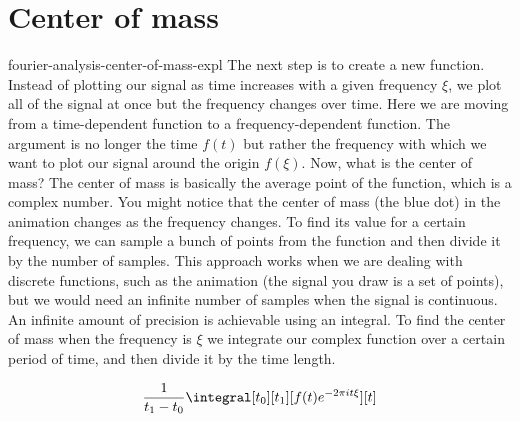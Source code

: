 \documentclass[preview]{standalone}
\begin{document}
\genpage

\section{Center of mass}

\begin{snippet}{fourier-analysis-center-of-mass-expl}
    The next step is to create a new function. Instead of plotting our signal
    as time increases with a given frequency \(\xi\), we plot all of the
    signal at once but the frequency changes over time. Here we are moving from
    a time-dependent function to a frequency-dependent function. The argument is
    no longer the time \(f(t)\) but rather the frequency with which we want to plot our signal
    around the origin \(f(\xi)\). Now, what is the center of mass? The center of mass is
    basically the average point of the function, which is a complex number.
    You might notice that the center of mass (the blue dot) in the animation changes
    as the frequency changes. To find its value for a certain frequency, we can sample
    a bunch of points from the function and then divide it by the number of samples.
    This approach works when we are dealing with discrete functions, such as the animation
    (the signal you draw is a set of points), but we would need an infinite number of samples
    when the signal is continuous. An infinite amount of precision is achievable using an integral.
    To find the center of mass when the frequency is \(\xi\) we integrate our complex function over
    a certain period of time, and then divide it by the time length.

    \[
        \frac{1}{t_1-t_0}
        \integral[t_0][t_1][f(t)e^{-2\pi i t\xi}][t]
    \]
\end{snippet}

\end{document}
